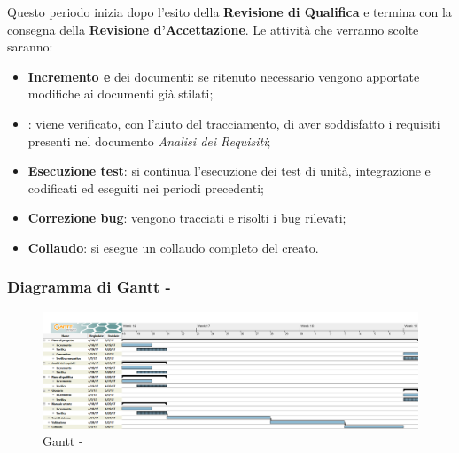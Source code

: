 \documentclass[./PianoDiProgetto.tex]{subfiles}
\begin{document}
  Questo periodo inizia dopo l'esito della \textbf{Revisione di Qualifica} e termina con la consegna della \textbf{Revisione d'Accettazione}. Le attività che verranno scolte saranno:
  \begin{itemize}
    \item \textbf{Incremento e } dei documenti: se ritenuto necessario vengono apportate modifiche ai documenti già stilati;
    \item \textbf{}: viene verificato, con l'aiuto del tracciamento, di aver soddisfatto i requisiti presenti nel documento \textit{Analisi dei Requisiti};
    \item \textbf{Esecuzione test}: si continua l'esecuzione dei test di unità, integrazione e  codificati ed eseguiti nei periodi precedenti;
    \item \textbf{Correzione bug}: vengono tracciati e risolti i bug rilevati;
    \item \textbf{Collaudo}: si esegue un collaudo completo del  creato.
  \end{itemize}

  \subsubsection{Diagramma di Gantt - \PerV}
    \begin{figure}[!h]
    \centering
    \includegraphics[width=\textwidth]{images/V}
    \caption{Gantt - \PerV}
    \end{figure}
\end{document}
